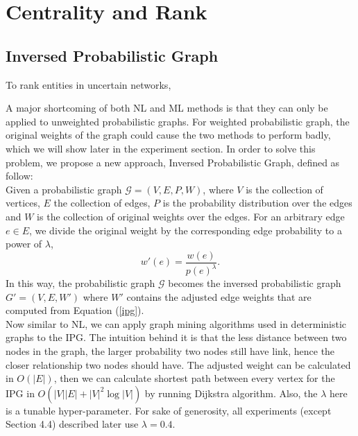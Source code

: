 \documentclass[\main/thesis.tex]{subfiles}
\begin{document}
\chapter{Centrality and Rank}
\section{Inversed Probabilistic Graph}
To rank entities in uncertain networks,

A major shortcoming of both NL and ML methods is that they can only be applied to unweighted probabilistic graphs. For weighted probabilistic graph, the original weights of the graph could cause the two methods to perform badly, which we will show later in the experiment section. In order to solve this problem, we propose a new approach, Inversed Probabilistic Graph, defined as follow:\\
Given a probabilistic graph $\mathcal{G} = (V, E, P, W )$, where $V$ is the collection of vertices, $E$ the collection of edges, $P$ is the probability distribution over the edges and $W$ is the collection of original weights over the edges. For an arbitrary edge $e \in E$, we divide the original weight by the corresponding edge probability to a power of $\lambda$,
\begin{equation}
w'(e) = \frac{w(e)}{p(e)^\lambda }. \label{ipg}
\end{equation}
In this way, the probabilistic graph $\mathcal{G}$ becomes the inversed probabilistic graph $G' = (V, E, W')$ where $W'$ contains the adjusted edge weights that are computed from Equation (\ref{ipg}).  \\
Now similar to NL, we can apply graph mining algorithms used in deterministic graphs to the IPG. The intuition behind it is that the less distance between two nodes in the graph, the larger probability two nodes still have link, hence the closer relationship two nodes should have. The adjusted weight can be calculated in $O(|E|)$, then we can calculate shortest path between every vertex for the IPG in $O(|V||E|+|V|^2 \log|V|)$ by running Dijkstra algorithm. Also, the $\lambda$ here is a tunable hyper-parameter. For sake of generosity, all experiments (except Section 4.4) described later use $\lambda = 0.4$. \\
\end{document}
